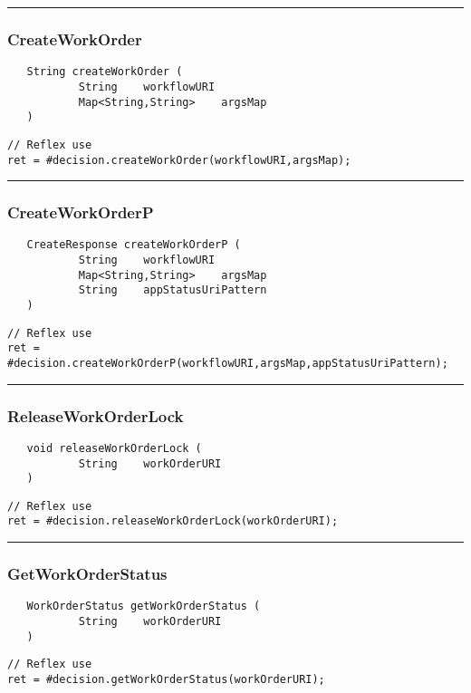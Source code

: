 \rule{15cm}{2pt}
\subsubsection{CreateWorkOrder}
\label{Api:CreateWorkOrder}
\begin{verbatim}
   String createWorkOrder (
           String    workflowURI
           Map<String,String>    argsMap
   )
\end{verbatim}
\begin{lstlisting}[language=reflex]
// Reflex use
ret = #decision.createWorkOrder(workflowURI,argsMap);
\end{lstlisting}



\rule{15cm}{2pt}
\subsubsection{CreateWorkOrderP}
\label{Api:CreateWorkOrderP}
\begin{verbatim}
   CreateResponse createWorkOrderP (
           String    workflowURI
           Map<String,String>    argsMap
           String    appStatusUriPattern
   )
\end{verbatim}
\begin{lstlisting}[language=reflex]
// Reflex use
ret = #decision.createWorkOrderP(workflowURI,argsMap,appStatusUriPattern);
\end{lstlisting}



\rule{15cm}{2pt}
\subsubsection{ReleaseWorkOrderLock}
\label{Api:ReleaseWorkOrderLock}
\begin{verbatim}
   void releaseWorkOrderLock (
           String    workOrderURI
   )
\end{verbatim}
\begin{lstlisting}[language=reflex]
// Reflex use
ret = #decision.releaseWorkOrderLock(workOrderURI);
\end{lstlisting}



\rule{15cm}{2pt}
\subsubsection{GetWorkOrderStatus}
\label{Api:GetWorkOrderStatus}
\begin{verbatim}
   WorkOrderStatus getWorkOrderStatus (
           String    workOrderURI
   )
\end{verbatim}
\begin{lstlisting}[language=reflex]
// Reflex use
ret = #decision.getWorkOrderStatus(workOrderURI);
\end{lstlisting}



